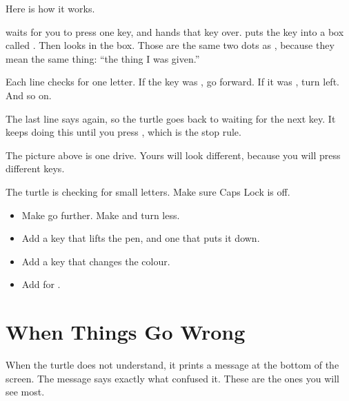 \documentclass[12pt,oneside,paper=5.5in:8.5in,DIV=11,chapterprefix=false,headings=big]{scrbook}
\begin{document}
Here is how it works.

 waits for you to press one key,
and hands that key over.
 puts the key into a box called .
Then  looks in the box.
Those are the same two dots as ,
because they mean the same thing:
``the thing I was given.''

Each  line checks for one letter.
If the key was , go forward.
If it was , turn left.
And so on.

The last line says  again,
so the turtle goes back to waiting for the next key.
It keeps doing this until you press ,
which is the stop rule.

The picture above is one drive.
Yours will look different,
because you will press different keys.

\begin{heads}
The turtle is checking for small letters.
Make sure Caps Lock is off.
\end{heads}

\begin{trythis}[Try]
\begin{itemize}
\item Make  go further. Make  and  turn less.
\item Add a key that lifts the pen, and one that puts it down.
\item Add a key that changes the colour.
\item Add  for .
\end{itemize}
\end{trythis}

\chaptericon{\faExclamationTriangle}
\chapter{When Things Go Wrong}
\label{ch:wrong}


When the turtle does not understand,
it prints a message at the bottom of the screen.
The message says exactly what confused it.
These are the ones you will see most.
\end{document}
